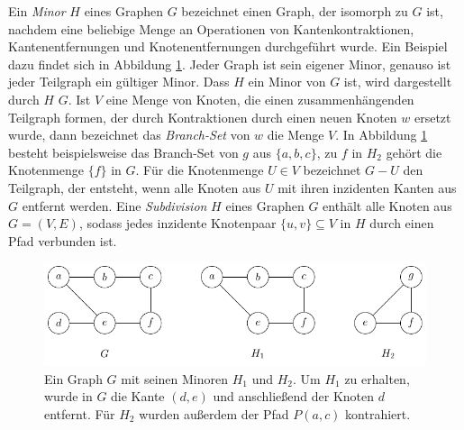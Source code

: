 Ein \emph{Minor} $H$ eines Graphen $G$ bezeichnet einen Graph, der isomorph zu $G$ ist, nachdem eine beliebige Menge an Operationen von Kantenkontraktionen, Kantenentfernungen und Knotenentfernungen durchgeführt wurde.
Ein Beispiel dazu findet sich in Abbildung \ref{fig:Minor}.
Jeder Graph ist sein eigener Minor, genauso ist jeder Teilgraph ein gültiger Minor.
Dass $H$ ein Minor von $G$ ist, wird dargestellt durch $H$ \minor $G$.
Ist $V$ eine Menge von Knoten, die einen zusammenhängenden Teilgraph formen, der durch Kontraktionen durch einen neuen Knoten $w$ ersetzt wurde, dann bezeichnet das \emph{Branch-Set} von $w$ die Menge $V$.
In Abbildung \ref{fig:Minor} besteht beispielsweise das Branch-Set von $g$ aus $\{a, b, c\}$, zu $f$ in $H_2$ gehört die Knotenmenge $\{f\}$ in $G$.
Für die Knotenmenge $U \in V$ bezeichnet $G - U$ den Teilgraph, der entsteht, wenn alle Knoten aus $U$ mit ihren inzidenten Kanten aus $G$ entfernt werden.
Eine \emph{Subdivision} $H$ eines Graphen $G$ enthält alle Knoten aus $G = (V, E)$, sodass jedes inzidente Knotenpaar $\{u, v\} \subseteq V$ in $H$ durch einen Pfad verbunden ist.
\begin{figure}[H]
  \centering
  \includegraphics[keepaspectratio]{bilder/Minor.pdf}
  \caption{Ein Graph $G$ mit seinen Minoren $H_1$ und $H_2$.
           Um $H_1$ zu erhalten, wurde in $G$ die Kante $(d, e)$ und anschließend der Knoten $d$ entfernt.
           Für $H_2$ wurden außerdem der Pfad $P(a, c)$ kontrahiert.}
  \label{fig:Minor}
\end{figure}

